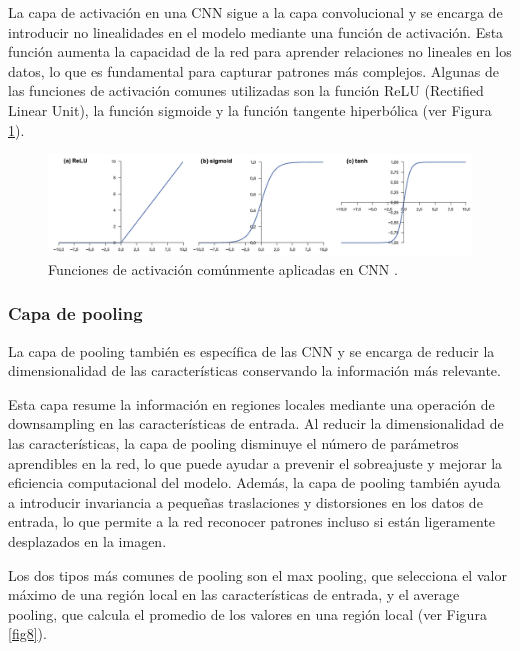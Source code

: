 La capa de activación en una CNN sigue a la capa convolucional y se encarga de introducir no linealidades en el modelo mediante una función de activación.
Esta función aumenta la capacidad de la red para aprender relaciones no lineales en los datos, lo que es fundamental para capturar patrones más complejos. Algunas de las funciones de activación comunes utilizadas son la función ReLU (Rectified Linear Unit), la función sigmoide y la función tangente hiperbólica (ver Figura \ref{fig7}).

\begin{figure}[h]
	\centering
	\includegraphics[scale=0.55]{imagenes/cap2/activation.png}
	\caption{Funciones de activación comúnmente aplicadas en CNN \cite{40}.}
	\label{fig7}
\end{figure}

\subsubsection*{Capa de pooling}
La capa de pooling también es específica de las CNN y se encarga de reducir la dimensionalidad de las características conservando la información más relevante.

Esta capa resume la información en regiones locales mediante una operación de downsampling en las características de entrada. Al reducir la dimensionalidad de las características, la capa de pooling disminuye el número de parámetros aprendibles en la red, lo que puede ayudar a prevenir el sobreajuste y mejorar la eficiencia computacional del modelo. Además, la capa de pooling también ayuda a introducir invariancia a pequeñas traslaciones y distorsiones en los datos de entrada, lo que permite a la red reconocer patrones incluso si están ligeramente desplazados en la imagen. 

Los dos tipos más comunes de pooling son el max pooling, que selecciona el valor máximo de una región local en las características de entrada, y el average pooling, que calcula el promedio de los valores en una región local (ver Figura \ref{fig8}).

